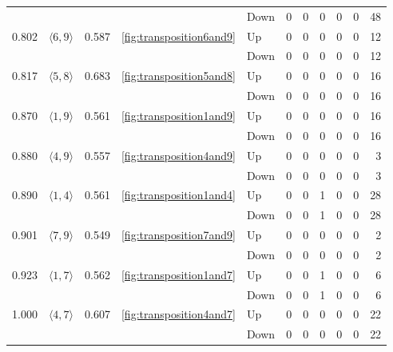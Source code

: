 \documentclass{article}
\begin{document}
\begin{center}
\begin{tabular}{lllllrrrrrr}
 &  &  &  & Down & 0 & 0 & 0 & 0 & 0 & 48 \\
\cline{1-11} \cline{2-11} \cline{3-11} \cline{4-11}
\multirow[t]{2}{*}{0.802} & \multirow[t]{2}{*}{$\langle6, 9\rangle$} & \multirow[t]{2}{*}{0.587} & \multirow[t]{2}{*}{\ref{fig:transposition6and9}} & Up & 0 & 0 & 0 & 0 & 0 & 12 \\
 &  &  &  & Down & 0 & 0 & 0 & 0 & 0 & 12 \\
\cline{1-11} \cline{2-11} \cline{3-11} \cline{4-11}
\multirow[t]{2}{*}{0.817} & \multirow[t]{2}{*}{$\langle5, 8\rangle$} & \multirow[t]{2}{*}{0.683} & \multirow[t]{2}{*}{\ref{fig:transposition5and8}} & Up & 0 & 0 & 0 & 0 & 0 & 16 \\
 &  &  &  & Down & 0 & 0 & 0 & 0 & 0 & 16 \\
\cline{1-11} \cline{2-11} \cline{3-11} \cline{4-11}
\multirow[t]{2}{*}{0.870} & \multirow[t]{2}{*}{$\langle1, 9\rangle$} & \multirow[t]{2}{*}{0.561} & \multirow[t]{2}{*}{\ref{fig:transposition1and9}} & Up & 0 & 0 & 0 & 0 & 0 & 16 \\
 &  &  &  & Down & 0 & 0 & 0 & 0 & 0 & 16 \\
\cline{1-11} \cline{2-11} \cline{3-11} \cline{4-11}
\multirow[t]{2}{*}{0.880} & \multirow[t]{2}{*}{$\langle4, 9\rangle$} & \multirow[t]{2}{*}{0.557} & \multirow[t]{2}{*}{\ref{fig:transposition4and9}} & Up & 0 & 0 & 0 & 0 & 0 & 3 \\
 &  &  &  & Down & 0 & 0 & 0 & 0 & 0 & 3 \\
\cline{1-11} \cline{2-11} \cline{3-11} \cline{4-11}
\multirow[t]{2}{*}{0.890} & \multirow[t]{2}{*}{$\langle1, 4\rangle$} & \multirow[t]{2}{*}{0.561} & \multirow[t]{2}{*}{\ref{fig:transposition1and4}} & Up & 0 & 0 & 1 & 0 & 0 & 28 \\
 &  &  &  & Down & 0 & 0 & 1 & 0 & 0 & 28 \\
\cline{1-11} \cline{2-11} \cline{3-11} \cline{4-11}
\multirow[t]{2}{*}{0.901} & \multirow[t]{2}{*}{$\langle7, 9\rangle$} & \multirow[t]{2}{*}{0.549} & \multirow[t]{2}{*}{\ref{fig:transposition7and9}} & Up & 0 & 0 & 0 & 0 & 0 & 2 \\
 &  &  &  & Down & 0 & 0 & 0 & 0 & 0 & 2 \\
\cline{1-11} \cline{2-11} \cline{3-11} \cline{4-11}
\multirow[t]{2}{*}{0.923} & \multirow[t]{2}{*}{$\langle1, 7\rangle$} & \multirow[t]{2}{*}{0.562} & \multirow[t]{2}{*}{\ref{fig:transposition1and7}} & Up & 0 & 0 & 1 & 0 & 0 & 6 \\
 &  &  &  & Down & 0 & 0 & 1 & 0 & 0 & 6 \\
\cline{1-11} \cline{2-11} \cline{3-11} \cline{4-11}
\multirow[t]{2}{*}{1.000} & \multirow[t]{2}{*}{$\langle4, 7\rangle$} & \multirow[t]{2}{*}{0.607} & \multirow[t]{2}{*}{\ref{fig:transposition4and7}} & Up & 0 & 0 & 0 & 0 & 0 & 22 \\
 &  &  &  & Down & 0 & 0 & 0 & 0 & 0 & 22 \\
\cline{1-11} \cline{2-11} \cline{3-11} \cline{4-11}
\bottomrule
\end{tabular}

\end{center}
\newpage 
\end{document}
